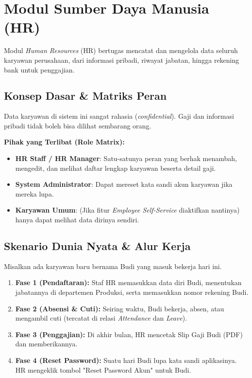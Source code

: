 \chapter{Modul Sumber Daya Manusia (HR)}

Modul \textit{Human Resources} (HR) bertugas mencatat dan mengelola data seluruh karyawan perusahaan, dari informasi pribadi, riwayat jabatan, hingga rekening bank untuk penggajian.

\section{Konsep Dasar \& Matriks Peran}
Data karyawan di sistem ini sangat rahasia (\textit{confidential}). Gaji dan informasi pribadi tidak boleh bisa dilihat sembarang orang.

\textbf{Pihak yang Terlibat (Role Matrix):}
\begin{itemize}
    \item \textbf{HR Staff / HR Manager}: Satu-satunya peran yang berhak menambah, mengedit, dan melihat daftar lengkap karyawan beserta detail gaji.
    \item \textbf{System Administrator}: Dapat mereset kata sandi akun karyawan jika mereka lupa.
    \item \textbf{Karyawan Umum}: (Jika fitur \textit{Employee Self-Service} diaktifkan nantinya) hanya dapat melihat data dirinya sendiri.
\end{itemize}

\section{Skenario Dunia Nyata \& Alur Kerja}
Misalkan ada karyawan baru bernama Budi yang masuk bekerja hari ini.
\begin{enumerate}
    \item \textbf{Fase 1 (Pendaftaran):} Staf HR memasukkan data diri Budi, menentukan jabatannya di departemen Produksi, serta memasukkan nomor rekening Budi.
    \item \textbf{Fase 2 (Absensi \& Cuti):} Seiring waktu, Budi bekerja, absen, atau mengambil cuti (tercatat di relasi \textit{Attendance} dan \textit{Leave}).
    \item \textbf{Fase 3 (Penggajian):} Di akhir bulan, HR mencetak Slip Gaji Budi (PDF) dan memberikannya.
    \item \textbf{Fase 4 (Reset Password):} Suatu hari Budi lupa kata sandi aplikasinya. HR mengeklik tombol "Reset Password Akun" untuk Budi.
\end{enumerate}

